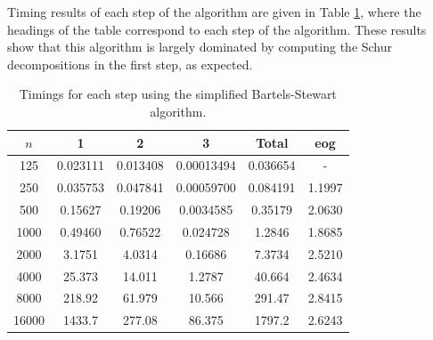 \documentclass[11pt]{article}
\numberwithin{equation}{section}
\begin{document}
Timing results of each step of the algorithm are given in Table \ref{table:bartels simplified steps}, where the headings of the table correspond to each step of the algorithm. These results show that this algorithm is largely dominated by computing the Schur decompositions in the first step, as expected.

\begin{table}[H]
\centering
\begin{tabular}{|c|c|c|c|c|c|}
\hline
$n$ & 1 & 2 & 3 & Total & eog \\
\hline
125 & 0.023111 & 0.013408 & 0.00013494 & 0.036654 & - \\
250 & 0.035753 & 0.047841 & 0.00059700 & 0.084191 & 1.1997 \\
500 & 0.15627 & 0.19206 & 0.0034585 & 0.35179 & 2.0630 \\ 
1000 & 0.49460 & 0.76522 & 0.024728 & 1.2846 & 1.8685 \\
2000 & 3.1751 & 4.0314 & 0.16686 & 7.3734 & 2.5210 \\
4000 & 25.373 & 14.011 & 1.2787 & 40.664 & 2.4634 \\
8000 & 218.92 & 61.979 & 10.566 & 291.47 & 2.8415 \\
16000 & 1433.7 & 277.08 & 86.375 & 1797.2 & 2.6243 \\
\hline
\end{tabular}
\caption{Timings for each step using the simplified Bartels-Stewart algorithm.}
\label{table:bartels simplified steps}
\end{table}
\end{document}
